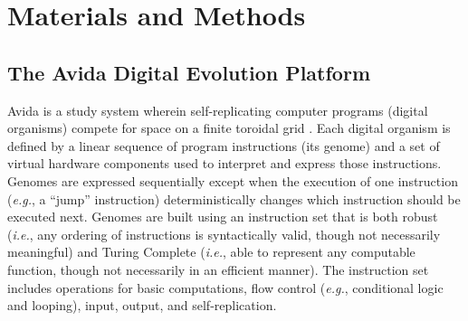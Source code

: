 
\section{Materials and Methods}

\subsection{The Avida Digital Evolution Platform}

Avida is a study system wherein self-replicating computer programs (digital organisms) compete for space on a finite toroidal grid \citep{ofria_avida:_2009}.
Each digital organism is defined by a linear sequence of program instructions (its genome) and a set of virtual hardware components used to interpret and express those instructions. 
Genomes are expressed sequentially except when the execution of one instruction (\textit{e.g.}, a ``jump'' instruction) deterministically changes which instruction should be executed next. 
Genomes are built using an instruction set that is both robust (\textit{i.e.}, any ordering of instructions is syntactically valid, though not necessarily meaningful) and Turing Complete (\textit{i.e.}, able to represent any computable function, though not necessarily in an efficient manner).
The instruction set includes operations for basic computations, flow control (\textit{e.g.}, conditional logic and looping), input, output, and self-replication.

